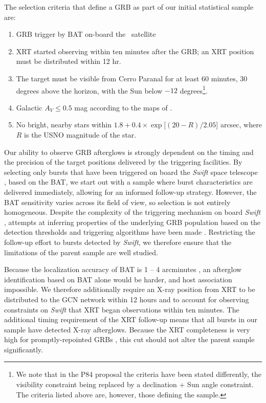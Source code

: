 \documentclass[longauth]{aa}    %
\begin{document}
The selection criteria that define a GRB as part of our initial statistical
	sample are:

\begin{enumerate}
	
	\item GRB trigger by BAT on-board the \swift~satellite

	\item XRT started observing within ten minutes after the GRB; an XRT position
	must be distributed within 12 hr.
	
	\item The target must be visible from Cerro Paranal for at least 60 minutes, 30
degrees above the horizon, with the Sun below $-12$ degrees\footnote{We note that
	in the P84 proposal the criteria have been stated differently, the visibility
	constraint being replaced by a declination + Sun angle constraint. The criteria
	listed above are, however, those defining the sample.}.

	\item Galactic $A_V \leq 0.5$ mag according to the maps of \citet{Schlegel1998}.
	
	\item No bright, nearby stars within $ 1.8 + 0.4 \times \exp[(20 - R)/2.05$]
arcsec, where $R$ is the USNO magnitude of the star.
	
\end{enumerate}

Our ability to observe GRB afterglows is strongly dependent on the timing and
the precision of the target positions delivered by the triggering facilities. By
selecting only bursts that have been triggered on board the \textit{Swift} space
telescope \citep{Gehrels2004}, based on the BAT, we start out with a sample
where burst characteristics are delivered immediately, allowing for an informed
follow-up strategy. However, the BAT sensitivity varies across its field of
view, so selection is not entirely homogeneous. Despite the complexity of the
triggering mechanism on board \textit{Swift} \citep{Band2006, Coward2013a},
attempts at inferring properties of the underlying GRB population based on the
detection thresholds and triggering algorithms have been made \citep{Lien2014,
	Graff2016}. Restricting the follow-up effort to bursts detected by
\textit{Swift}, we therefore ensure that the limitations of the parent sample
are well studied.

Because the localization accuracy of BAT is 1 -- 4 arcminutes
\citep{Barthelmy2005}, an afterglow identification based on BAT alone would be
harder, and  host association impossible. We therefore additionally require an
X-ray position from XRT to be distributed to the GCN network
\citep{Barthelmy2000} within 12 hours and to account for observing constraints
on \textit{Swift} that XRT began observations within ten minutes. The additional
timing requirement of the XRT follow-up means that all bursts in our sample have
detected X-ray afterglows. Because the XRT completeness is very high for
promptly-repointed GRBs \citep{Burrows2007}, this cut should not alter the
parent sample significantly.
\end{document}
